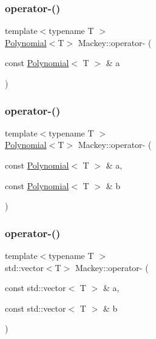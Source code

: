 \mbox{\label{namespaceMackey_a76e1e4a6dac913bc86971d8515475fa5}} 
\subsubsection{\texorpdfstring{operator-\/()}{operator-()}\hspace{0.1cm}{\footnotesize\ttfamily [1/4]}}
{\footnotesize\ttfamily template$<$typename T $>$ \\
\hyperlink{classMackey_1_1Polynomial}{Polynomial}$<$T$>$ Mackey\+::operator-\/ (\begin{DoxyParamCaption}\item[{const \hyperlink{classMackey_1_1Polynomial}{Polynomial}$<$ T $>$ \&}]{a }\end{DoxyParamCaption})}

\mbox{\label{namespaceMackey_a803f57e25754b9ca58e4757a46f9b23a}} 
\subsubsection{\texorpdfstring{operator-\/()}{operator-()}\hspace{0.1cm}{\footnotesize\ttfamily [2/4]}}
{\footnotesize\ttfamily template$<$typename T $>$ \\
\hyperlink{classMackey_1_1Polynomial}{Polynomial}$<$T$>$ Mackey\+::operator-\/ (\begin{DoxyParamCaption}\item[{const \hyperlink{classMackey_1_1Polynomial}{Polynomial}$<$ T $>$ \&}]{a,  }\item[{const \hyperlink{classMackey_1_1Polynomial}{Polynomial}$<$ T $>$ \&}]{b }\end{DoxyParamCaption})}

\mbox{\label{namespaceMackey_ae86e49097ef9a09ebcd0173881e88786}} 
\subsubsection{\texorpdfstring{operator-\/()}{operator-()}\hspace{0.1cm}{\footnotesize\ttfamily [3/4]}}
{\footnotesize\ttfamily template$<$typename T $>$ \\
std\+::vector$<$T$>$ Mackey\+::operator-\/ (\begin{DoxyParamCaption}\item[{const std\+::vector$<$ T $>$ \&}]{a,  }\item[{const std\+::vector$<$ T $>$ \&}]{b }\end{DoxyParamCaption})}



